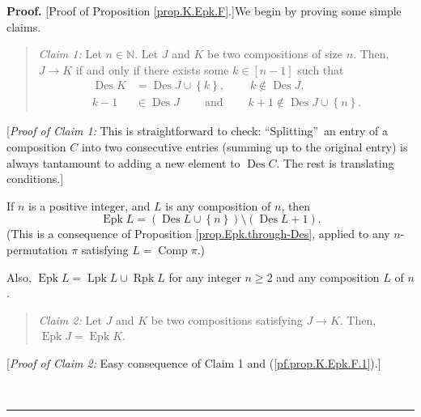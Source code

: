 \documentclass[numbers=enddot,12pt,final,onecolumn,notitlepage]{scrartcl}%
\theoremstyle{definition}
\newenvironment{statement}{\begin{quote}}{\end{quote}}
\newenvironment{proof}[1][Proof]{\noindent\textbf{#1.} }{\ \rule{0.5em}{0.5em}}
\newenvironment{verlong}{}{}
\newenvironment{noncompile}{}{}
\begin{document}
\begin{verlong}
\begin{proof}
[Proof of Proposition \ref{prop.K.Epk.F}.]We begin by proving some simple claims.

\begin{statement}
\textit{Claim 1:} Let $n\in\mathbb{N}$. Let $J$ and $K$ be two compositions of
size $n$. Then, $J\rightarrow K$ if and only if there exists some $k\in\left[
n-1\right]  $ such that
\begin{align*}
\operatorname*{Des}K  &  =\operatorname*{Des}J\cup\left\{  k\right\}
,\ \ \ \ \ \ \ \ \ \ k\notin\operatorname*{Des}J,\\
k-1  &  \in\operatorname*{Des}J\ \ \ \ \ \ \ \ \ \ \text{and}%
\ \ \ \ \ \ \ \ \ \ k+1\notin\operatorname*{Des}J\cup\left\{  n\right\}  .
\end{align*}

\end{statement}

[\textit{Proof of Claim 1:} This is straightforward to check:
\textquotedblleft Splitting\textquotedblright\ an entry of a composition $C$
into two consecutive entries (summing up to the original entry) is always
tantamount to adding a new element to $\operatorname*{Des}C$. The rest is
translating conditions.]

If $n$ is a positive integer, and $L$ is any composition of $n$, then
\begin{equation}
\operatorname*{Epk}L=\left(  \operatorname*{Des}L\cup\left\{  n\right\}
\right)  \setminus\left(  \operatorname*{Des}L+1\right)  .
\label{pf.prop.K.Epk.F.1}%
\end{equation}
(This is a consequence of Proposition \ref{prop.Epk.through-Des}, applied to
any $n$-permutation $\pi$ satisfying $L=\operatorname*{Comp}\pi$.)

\begin{noncompile}
Also, $\operatorname*{Epk}L=\operatorname*{Lpk}L\cup\operatorname*{Rpk}L$ for
any integer $n\geq2$ and any composition $L$ of $n$.
\end{noncompile}

\begin{statement}
\textit{Claim 2:} Let $J$ and $K$ be two compositions satisfying $J\rightarrow
K$. Then, $\operatorname*{Epk}J=\operatorname*{Epk}K$.
\end{statement}

[\textit{Proof of Claim 2:} Easy consequence of Claim 1 and
(\ref{pf.prop.K.Epk.F.1}).]


\end{proof}
\end{verlong}
\end{document}
